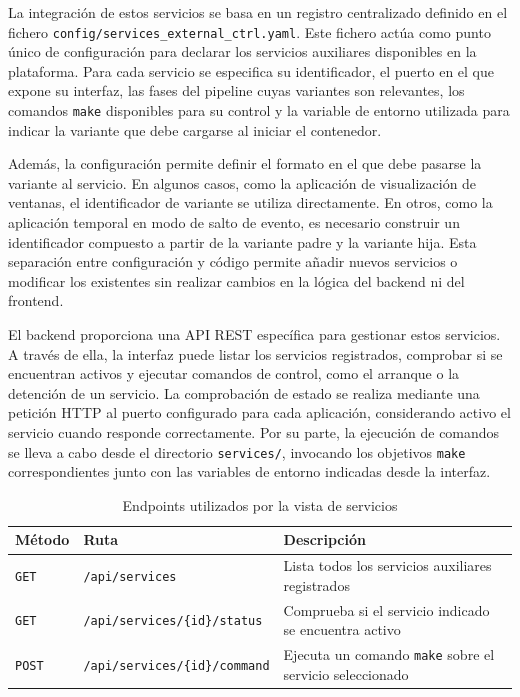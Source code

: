 La integración de estos servicios se basa en un registro centralizado definido en el fichero \texttt{config/services\_external\_ctrl.yaml}. Este fichero actúa como punto único de configuración para declarar los servicios auxiliares disponibles en la plataforma. Para cada servicio se especifica su identificador, el puerto en el que expone su interfaz, las fases del pipeline cuyas variantes son relevantes, los comandos \texttt{make} disponibles para su control y la variable de entorno utilizada para indicar la variante que debe cargarse al iniciar el contenedor.

Además, la configuración permite definir el formato en el que debe pasarse la variante al servicio. En algunos casos, como la aplicación de visualización de ventanas, el identificador de variante se utiliza directamente. En otros, como la aplicación temporal en modo de salto de evento, es necesario construir un identificador compuesto a partir de la variante padre y la variante hija. Esta separación entre configuración y código permite añadir nuevos servicios o modificar los existentes sin realizar cambios en la lógica del backend ni del frontend.

El backend proporciona una API REST específica para gestionar estos servicios. A través de ella, la interfaz puede listar los servicios registrados, comprobar si se encuentran activos y ejecutar comandos de control, como el arranque o la detención de un servicio. La comprobación de estado se realiza mediante una petición HTTP al puerto configurado para cada aplicación, considerando activo el servicio cuando responde correctamente. Por su parte, la ejecución de comandos se lleva a cabo desde el directorio \texttt{services/}, invocando los objetivos \texttt{make} correspondientes junto con las variables de entorno indicadas desde la interfaz.

\begin{table}[H]
\centering
\renewcommand{\arraystretch}{1.3}
\begin{tabular}{|l|l|p{6.5cm}|}
\hline
\textbf{Método} & \textbf{Ruta} & \textbf{Descripción} \\ \hline
\texttt{GET} & \texttt{/api/services} & Lista todos los servicios auxiliares registrados \\ \hline
\texttt{GET} & \texttt{/api/services/\{id\}/status} & Comprueba si el servicio indicado se encuentra activo \\ \hline
\texttt{POST} & \texttt{/api/services/\{id\}/command} & Ejecuta un comando \texttt{make} sobre el servicio seleccionado \\ \hline
\end{tabular}
\caption{Endpoints utilizados por la vista de servicios}
\label{tab:api-vista-servicios}
\end{table}

